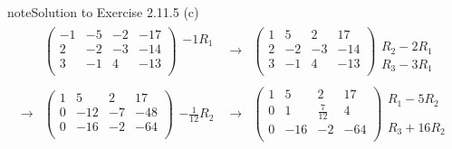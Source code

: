\documentclass[letterpaper,10pt,english]{jupyterBook}
\begin{document}
\begin{sphinxadmonition}{note}{Solution to Exercise 2.11.5}
\sphinxAtStartPar
(c)
\begin{equation*}
\begin{split} \begin{align*} 
    & \left( \begin{array}{ccc|c} 
         -1 & -5 & -2 & -17 \\ 
         2 & -2 & -3 & -14 \\ 
         3 & -1 & 4 & -13 \\ 
    \end{array} \right) 
    \begin{array}{l} -1 R_{1}\\ \phantom{x} \\ \phantom{x} \end{array} & 
    \longrightarrow 
    & \left( \begin{array}{ccc|c} 
         1 & 5 & 2 & 17 \\ 
         2 & -2 & -3 & -14 \\ 
         3 & -1 & 4 & -13 \\ 
    \end{array} \right) 
    \begin{array}{l} \phantom{x} \\ R_{2} - 2 R_{1} \\ R_{3} - 3 R_{1} \end{array} \\ \\ 
    \longrightarrow 
    & \left( \begin{array}{ccc|c} 
         1 & 5 & 2 & 17 \\ 
         0 & -12 & -7 & -48 \\ 
         0 & -16 & -2 & -64 \\ 
    \end{array} \right) 
    \begin{array}{l} \phantom{x} \\ - \frac{1}{12} R_{2}\\ \phantom{x} \end{array} & 
    \longrightarrow 
    & \left( \begin{array}{ccc|c} 
         1 & 5 & 2 & 17 \\ 
         0 & 1 & \frac{7}{12} & 4 \\ 
         0 & -16 & -2 & -64 \\ 
    \end{array} \right) 
    \begin{array}{l} R_{1} - 5 R_{2} \\ \phantom{x} \\ R_{3} + 16 R_{2}\end{array} \\ \\ 

\end{align*}
\end{split}
\end{equation*}
\end{sphinxadmonition}
\end{document}
